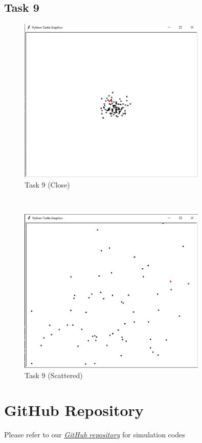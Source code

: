 \documentclass[answers]{exam}
\begin{document}
\subsection{Task 9}
    \begin{figure}[H]
        \centering
        \includegraphics[width = 0.8\textwidth]{Graphs/9a.png}
        \caption{Task 9 (Close)}
        \label{fig:task9_a}
    \end{figure}\\
    \begin{figure}[H]
        \centering
        \includegraphics[width = 0.8\textwidth]{Graphs/9b.png}
        \caption{Task 9 (Scattered)}
        \label{fig:task9_b}
    \end{figure}

\section{GitHub Repository}
Please refer to our \href{https://github.com/FasihHussain22/Probability-Project/tree/master}{\emph{GitHub repository}} for simulation codes
\end{document}
